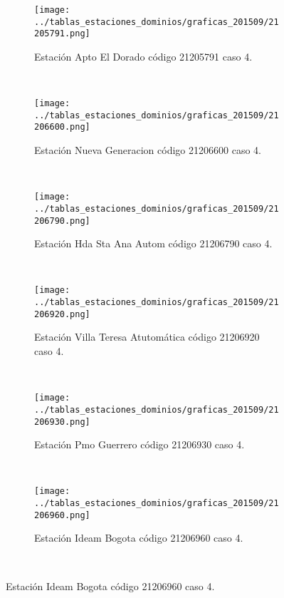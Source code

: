 \begin{figure}[H]\ContinuedFloat
\centering
\begin{subfigure}[normla]{0.4\textwidth}
\texttt{[image: ../tablas\_estaciones\_dominios/graficas\_201509/21205791.png]}
\caption{Estación Apto El Dorado código 21205791 caso 4.}
\end{subfigure}
~
\begin{subfigure}[normla]{0.4\textwidth}
\texttt{[image: ../tablas\_estaciones\_dominios/graficas\_201509/21206600.png]}
\caption{Estación Nueva Generacion código 21206600 caso 4.}
\end{subfigure}
~
\begin{subfigure}[normla]{0.4\textwidth}
\texttt{[image: ../tablas\_estaciones\_dominios/graficas\_201509/21206790.png]}
\caption{Estación Hda Sta Ana Autom código 21206790 caso 4.}
\end{subfigure}
~
\begin{subfigure}[normla]{0.4\textwidth}
\texttt{[image: ../tablas\_estaciones\_dominios/graficas\_201509/21206920.png]}
\caption{Estación Villa Teresa Atutomática código 21206920 caso 4.}
\end{subfigure}
~
\begin{subfigure}[normla]{0.4\textwidth}
\texttt{[image: ../tablas\_estaciones\_dominios/graficas\_201509/21206930.png]}
\caption{Estación Pmo Guerrero código 21206930 caso 4.}
\end{subfigure}
~
\begin{subfigure}[normla]{0.4\textwidth}
\texttt{[image: ../tablas\_estaciones\_dominios/graficas\_201509/21206960.png]}
\caption{Estación Ideam Bogota código 21206960 caso 4.}
\end{subfigure}
~
\end{figure}
 
